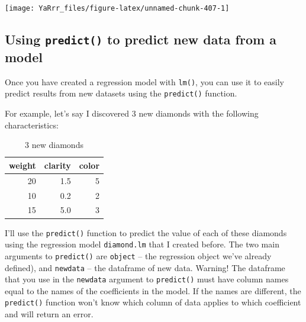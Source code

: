\documentclass[]{book}
\theoremstyle{definition}
\theoremstyle{definition}
\theoremstyle{remark}
\begin{document}
\begin{center}\texttt{[image: YaRrr\_files/figure-latex/unnamed-chunk-407-1]} \end{center}

\subsection{\texorpdfstring{Using \texttt{predict()} to predict new data
from a
model}{Using predict() to predict new data from a model}}\label{using-predict-to-predict-new-data-from-a-model}

Once you have created a regression model with \texttt{lm()}, you can use
it to easily predict results from new datasets using the
\texttt{predict()} function.

For example, let's say I discovered 3 new diamonds with the following
characteristics:

\begin{table}

\caption{\label{tab:unnamed-chunk-408}3 new diamonds}
\centering
\begin{tabular}[t]{r|r|r}
\hline
weight & clarity & color\\
\hline
20 & 1.5 & 5\\
\hline
10 & 0.2 & 2\\
\hline
15 & 5.0 & 3\\
\hline
\end{tabular}
\end{table}

I'll use the \texttt{predict()} function to predict the value of each of
these diamonds using the regression model \texttt{diamond.lm} that I
created before. The two main arguments to \texttt{predict()} are
\texttt{object} -- the regression object we've already defined), and
\texttt{newdata} -- the dataframe of new data. Warning! The dataframe
that you use in the \texttt{newdata} argument to \texttt{predict()} must
have column names equal to the names of the coefficients in the model.
If the names are different, the \texttt{predict()} function won't know
which column of data applies to which coefficient and will return an
error.
\end{document}
